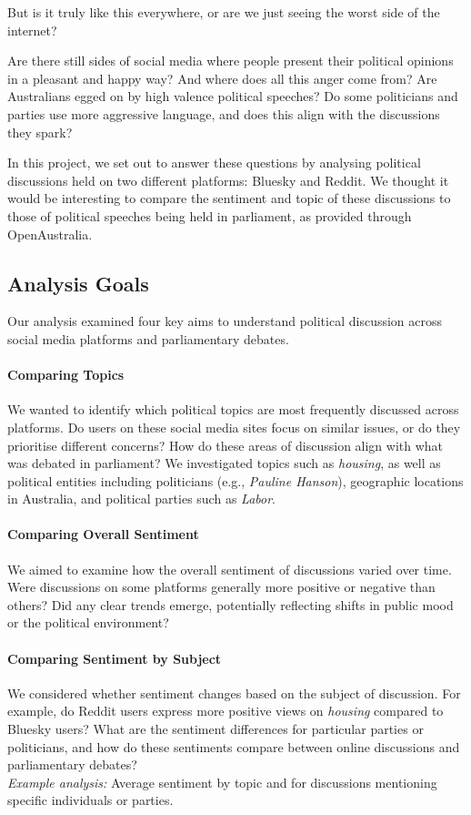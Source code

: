 \documentclass[]{article}
\numberwithin{equation}{section}
\begin{document}
But is it truly like this everywhere, or are we just seeing the worst side of the internet? 

Are there still sides of social media where people present their political opinions in a pleasant and happy way? 
And where does all this anger come from? 
Are Australians egged on by high valence political speeches? Do some politicians and parties use more aggressive language, and does this align with the discussions they spark? 

In this project, we set out to answer these questions by analysing political discussions held on two different platforms: Bluesky and Reddit.
We thought it would be interesting to compare the sentiment and topic of these discussions to those of political speeches being held in parliament, as provided through OpenAustralia.

\subsection*{Analysis Goals}

Our analysis examined four key aims to understand political discussion across social media platforms and parliamentary debates.

\paragraph*{Comparing Topics}
We wanted to identify which political topics are most frequently discussed across platforms. Do users on these social media sites focus on similar issues, or do they prioritise different concerns? How do these areas of discussion align with what was debated in parliament? 
We investigated topics such as \textit{housing}, as well as political entities including politicians (e.g., \textit{Pauline Hanson}), geographic locations in Australia, and political parties such as \textit{Labor}.

\paragraph*{Comparing Overall Sentiment}
We aimed to examine how the overall sentiment of discussions varied over time. 
Were discussions on some platforms generally more positive or negative than others? Did any clear trends emerge, potentially reflecting shifts in public mood or the political environment?

\paragraph*{Comparing Sentiment by Subject}
We considered whether sentiment changes based on the subject of discussion. For example, do Reddit users express more positive views on \textit{housing} compared to Bluesky users? 
What are the sentiment differences for particular parties or politicians, and how do these sentiments compare between online discussions and parliamentary debates? 
\\
\textit{Example analysis:} Average sentiment by topic and for discussions mentioning specific individuals or parties.
\end{document}
